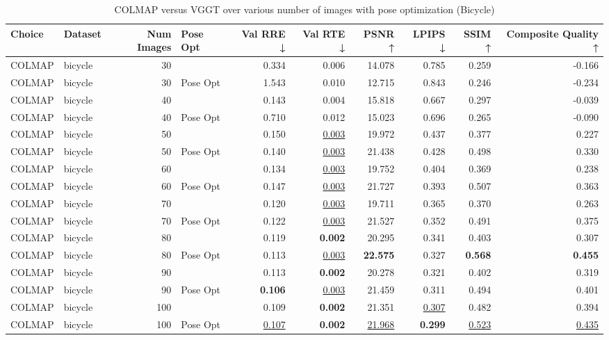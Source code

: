\begin{table}[H]
\caption{\ifdefined\customcaption \customcaption \else COLMAP versus VGGT over various number of images with pose optimization (Bicycle) \fi}
\label{tab:01_num_images_pose_opt_bicycle}
\centering
\tiny
\begin{tabular}{llrlrrrrrr}
\toprule
Choice & Dataset & Num Images & Pose Opt & Val RRE ↓ & Val RTE ↓ & PSNR ↑ & LPIPS ↓ & SSIM ↑ & Composite Quality ↑ \\
\midrule
COLMAP & bicycle & 30 &  & 0.334 & 0.006 & 14.078 & 0.785 & 0.259 & -0.166 \\
COLMAP & bicycle & 30 & Pose Opt & 1.543 & 0.010 & 12.715 & 0.843 & 0.246 & -0.234 \\
COLMAP & bicycle & 40 &  & 0.143 & 0.004 & 15.818 & 0.667 & 0.297 & -0.039 \\
COLMAP & bicycle & 40 & Pose Opt & 0.710 & 0.012 & 15.023 & 0.696 & 0.265 & -0.090 \\
COLMAP & bicycle & 50 &  & 0.150 & \underline{0.003} & 19.972 & 0.437 & 0.377 & 0.227 \\
COLMAP & bicycle & 50 & Pose Opt & 0.140 & \underline{0.003} & 21.438 & 0.428 & 0.498 & 0.330 \\
COLMAP & bicycle & 60 &  & 0.134 & \underline{0.003} & 19.752 & 0.404 & 0.369 & 0.238 \\
COLMAP & bicycle & 60 & Pose Opt & 0.147 & \underline{0.003} & 21.727 & 0.393 & 0.507 & 0.363 \\
COLMAP & bicycle & 70 &  & 0.120 & \underline{0.003} & 19.711 & 0.365 & 0.370 & 0.263 \\
COLMAP & bicycle & 70 & Pose Opt & 0.122 & \underline{0.003} & 21.527 & 0.352 & 0.491 & 0.375 \\
COLMAP & bicycle & 80 &  & 0.119 & \textbf{0.002} & 20.295 & 0.341 & 0.403 & 0.307 \\
COLMAP & bicycle & 80 & Pose Opt & 0.113 & \underline{0.003} & \textbf{22.575} & 0.327 & \textbf{0.568} & \textbf{0.455} \\
COLMAP & bicycle & 90 &  & 0.113 & \textbf{0.002} & 20.278 & 0.321 & 0.402 & 0.319 \\
COLMAP & bicycle & 90 & Pose Opt & \textbf{0.106} & \underline{0.003} & 21.459 & 0.311 & 0.494 & 0.401 \\
COLMAP & bicycle & 100 &  & 0.109 & \textbf{0.002} & 21.351 & \underline{0.307} & 0.482 & 0.394 \\
COLMAP & bicycle & 100 & Pose Opt & \underline{0.107} & \textbf{0.002} & \underline{21.968} & \textbf{0.299} & \underline{0.523} & \underline{0.435} \\

\end{tabular}
\end{table}
